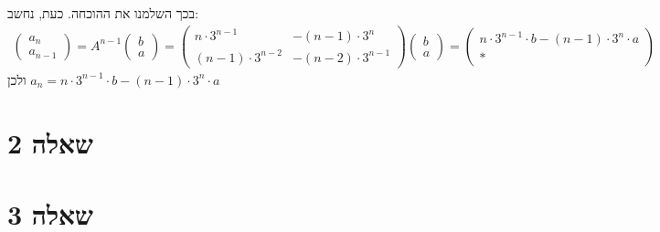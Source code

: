 \documentclass{article}
\begin{document}
בכך השלמנו את ההוכחה. כעת, נחשב:
\begin{align*}
    \begin{pmatrix}
        a_{n} \\
        a_{n-1}
    \end{pmatrix}=A^{n-1}\begin{pmatrix}
                             b \\
                             a
                         \end{pmatrix}=
    \begin{pmatrix}
        n \cdot 3^{n-1}     & -(n-1) \cdot 3^{n}   \\
        (n-1) \cdot 3^{n-2} & -(n-2) \cdot 3^{n-1}
    \end{pmatrix}\begin{pmatrix}
                     b \\
                     a
                 \end{pmatrix}=
    \begin{pmatrix}
        n \cdot 3^{n-1}\cdot b - (n-1) \cdot 3^n\cdot  a \\
        \ast
    \end{pmatrix}
\end{align*}
ולכן $a_n=n \cdot 3^{n-1}\cdot b - (n-1) \cdot 3^n \cdot a$

\pagebreak

\section*{שאלה 2}

\pagebreak

\section*{שאלה 3}
\end{document}
